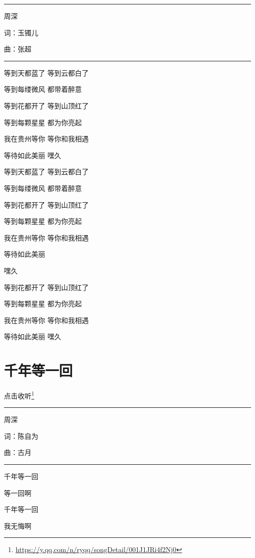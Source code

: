 \documentclass[]{ctexbook}
\renewcommand{\href}[2]{#2\footnote{\url{#1}}}
\begin{document}
\begin{center}\rule{0.5\linewidth}{0.5pt}\end{center}

周深

词：玉镯儿

曲：张超

\begin{center}\rule{0.5\linewidth}{0.5pt}\end{center}

等到天都蓝了 等到云都白了

等到每缕微风 都带着醉意

等到花都开了 等到山顶红了

等到每颗星星 都为你亮起

我在贵州等你 等你和我相遇

等待如此美丽 嘿久

等到天都蓝了 等到云都白了

等到每缕微风 都带着醉意

等到花都开了 等到山顶红了

等到每颗星星 都为你亮起

我在贵州等你 等你和我相遇

等待如此美丽

嘿久

等到花都开了 等到山顶红了

等到每颗星星 都为你亮起

我在贵州等你 等你和我相遇

等待如此美丽 嘿久

\section*{千年等一回}\label{once-in-1000}


\href{https://y.qq.com/n/ryqq/songDetail/001J1JRi4f2Nj0}{点击收听}

\begin{center}\rule{0.5\linewidth}{0.5pt}\end{center}

周深

词：陈自为

曲：古月

\begin{center}\rule{0.5\linewidth}{0.5pt}\end{center}

千年等一回

等一回啊

千年等一回

我无悔啊
\end{document}
